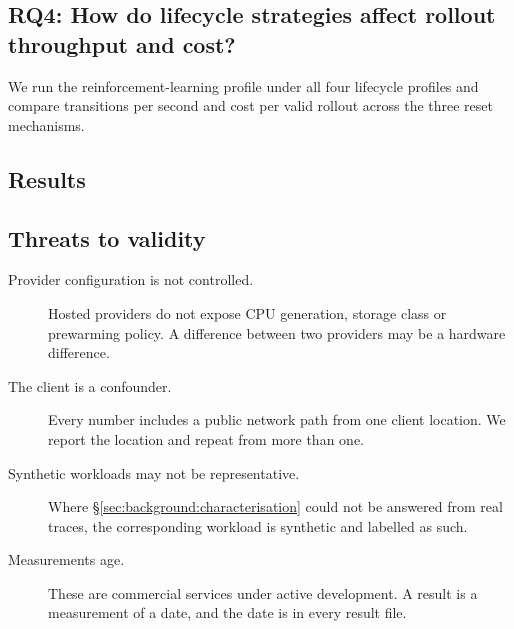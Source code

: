 \subsection*{RQ4: How do lifecycle strategies affect rollout throughput and cost?}

We run the reinforcement-learning profile under all four lifecycle profiles
and compare transitions per second and cost per valid rollout across the three
reset mechanisms.

\subsection{Results}

\begin{table}[t]
\caption{Headline results. Generated by \texttt{sandboxbench report
--format=latex}; do not edit by hand. }
\label{tab:results}
\small

\end{table}

\subsection{Threats to validity}

\begin{description}
  \item[Provider configuration is not controlled.] Hosted providers do not
  expose CPU generation, storage class or prewarming policy. A difference
  between two providers may be a hardware difference.
  \item[The client is a confounder.] Every number includes a public network
  path from one client location. We report the location and repeat from more
  than one. 
  \item[Synthetic workloads may not be representative.] Where
  \S\ref{sec:background:characterisation} could not be answered from real
  traces, the corresponding workload is synthetic and labelled as such.
  \item[Measurements age.] These are commercial services under active
  development. A result is a measurement of a date, and the date is in every
  result file.
\end{description}
